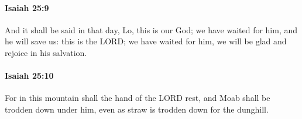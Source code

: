 		\paragraph{Isaiah 25:9} %
			\label{ISAIAH-25-9}

			And it shall be said in that day, Lo, this is our God; we have waited for him, and he will save us: this is the LORD; we have waited for him, we will be glad and rejoice in his salvation.


		\paragraph{Isaiah 25:10} %
			\label{ISAIAH-25-10}

			For in this mountain shall the hand of the LORD rest, and Moab shall be trodden down under him, even as straw is trodden down for the dunghill.


